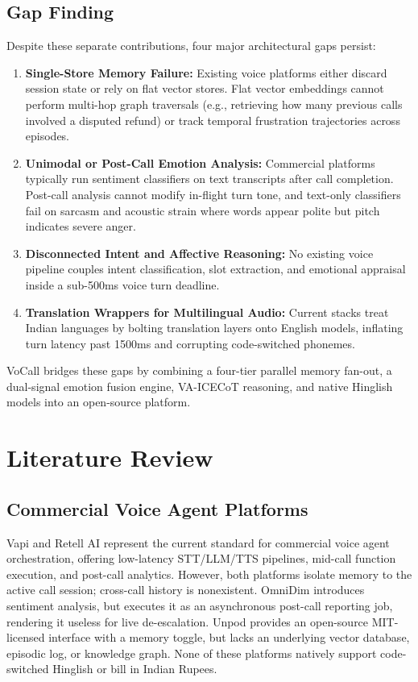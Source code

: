 \documentclass[conference]{IEEEtran}
\begin{document}
\subsection{Gap Finding}
Despite these separate contributions, four major architectural gaps persist:
\begin{enumerate}
    \item \textbf{Single-Store Memory Failure:} Existing voice platforms either discard session state or rely on flat vector stores. Flat vector embeddings cannot perform multi-hop graph traversals (e.g., retrieving how many previous calls involved a disputed refund) or track temporal frustration trajectories across episodes.
    \item \textbf{Unimodal or Post-Call Emotion Analysis:} Commercial platforms typically run sentiment classifiers on text transcripts after call completion. Post-call analysis cannot modify in-flight turn tone, and text-only classifiers fail on sarcasm and acoustic strain where words appear polite but pitch indicates severe anger.
    \item \textbf{Disconnected Intent and Affective Reasoning:} No existing voice pipeline couples intent classification, slot extraction, and emotional appraisal inside a sub-500ms voice turn deadline.
    \item \textbf{Translation Wrappers for Multilingual Audio:} Current stacks treat Indian languages by bolting translation layers onto English models, inflating turn latency past 1500ms and corrupting code-switched phonemes.
\end{enumerate}

VoCall bridges these gaps by combining a four-tier parallel memory fan-out, a dual-signal emotion fusion engine, VA-ICECoT reasoning, and native Hinglish models into an open-source platform.

\section{Literature Review}
\label{sec:literature}

\subsection{Commercial Voice Agent Platforms}
Vapi and Retell AI represent the current standard for commercial voice agent orchestration, offering low-latency STT/LLM/TTS pipelines, mid-call function execution, and post-call analytics. However, both platforms isolate memory to the active call session; cross-call history is nonexistent. OmniDim introduces sentiment analysis, but executes it as an asynchronous post-call reporting job, rendering it useless for live de-escalation. Unpod provides an open-source MIT-licensed interface with a memory toggle, but lacks an underlying vector database, episodic log, or knowledge graph. None of these platforms natively support code-switched Hinglish or bill in Indian Rupees.
\end{document}
